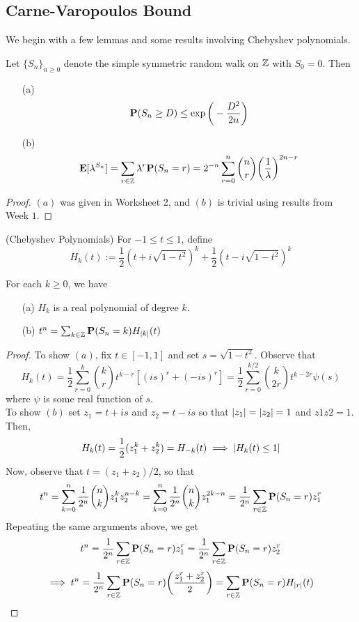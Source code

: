 \documentclass[main]{subfiles}
\begin{document}
\subsection*{Carne-Varopoulos Bound}
We begin with a few lemmas and some results involving Chebyshev polynomials.
\begin{lemma}
	Let $\{S_n\}_{n\ge 0}$ denote the simple symmetric random walk on $\Z$ with $S_0=0$. Then
	\begin{itemize}
		\item[(a)] \[\P(S_n\ge D)\le \exp\bigg(-\frac{D^2}{2n}\bigg)\]
		\item[(b)] \[\E[\lambda^{S_n}]=\sum_{r\in\Z}\lambda^r\P(S_n=r)=2^{-n}\sum_{r=0}^n\binom{n}{r}\bigg(\frac{1}{\lambda}\bigg)^{2n-r}\]
	\end{itemize}
\end{lemma}
\begin{proof}
	$(a)$ was given in Worksheet 2, and $(b)$ is trivial using results from Week $1$.
\end{proof}
\begin{definition}
	(Chebyshev Polynomials) For $-1\le t\le 1$, define
	\[H_k(t):=\frac{1}{2}(t+i\sqrt{1-t^2})^k+\frac{1}{2}(t-i\sqrt{1-t^2})^k\]
\end{definition}
\begin{lemma}
	For each $k\ge 0$, we have
	\begin{itemize}
		\item[(a)]$H_k$ is a real polynomial of degree $k$.
		\item[(b)]$t^n=\sum_{k\in\Z}\P(S_n=k)H_{\Mod{k}}(t)$
	\end{itemize}
\end{lemma}
\begin{proof}
	To show $(a)$, fix $t\in[-1,1]$ and set $s=\sqrt{1-t^2}$. Observe that
	\[H_k(t)=\frac{1}{2}\sum_{r=0}^k\binom{k}{r}t^{k-r}[(is)^r+(-is)^r]=\frac{1}{2}\sum_{r=0}^{k/2}\binom{k}{2r}t^{k-2r}\psi(s)\]
	where $\psi$ is some real function of $s$.\\
	To show $(b)$ set $z_1=t+is$ and $z_2=t-is$ so that $\Mod{z_1}=\Mod{z_2}=1$ and $z1z2=1$. Then,
	\[H_k(t)=\frac{1}{2}(z_1^k+z_2^k)=H_{-k}(t)\implies \Mod{H_k(t)\le 1}\]
	Now, observe that $t=(z_1+z_2)/2$, so that
	\[t^n=\sum_{k=0}^n\frac{1}{2^n}\binom{n}{k}z_1^kz_2^{n-k}=\sum_{k=0}^n\frac{1}{2^n}\binom{n}{k}z_1^{2k-n}=\frac{1}{2^n}\sum_{r\in\Z}\P(S_n=r)z_1^r\]
	Repeating the same arguments above, we get
	\[t^n=\frac{1}{2^n}\sum_{r\in\Z}\P(S_n=r)z_1^r=\frac{1}{2^n}\sum_{r\in\Z}\P(S_n=r)z_2^r\]
	\[\implies t^n=\frac{1}{2^n}\sum_{r\in\Z}\P(S_n=r)\bigg(\frac{z_1^r+z_2^r}{2}\bigg)=\sum_{r\in\Z}\P(S_n=r)H_{\Mod{r}}(t)\]
\end{proof}
\end{document}
